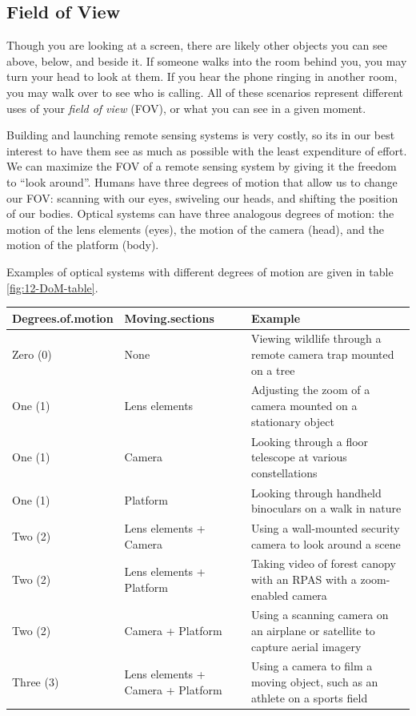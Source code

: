 \documentclass[
]{book}
\begin{document}
\hypertarget{field-of-view}{%
\subsection{Field of View}\label{field-of-view}}

Though you are looking at a screen, there are likely other objects you can see above, below, and beside it. If someone walks into the room behind you, you may turn your head to look at them. If you hear the phone ringing in another room, you may walk over to see who is calling. All of these scenarios represent different uses of your \emph{field of view} (FOV), or what you can see in a given moment.

Building and launching remote sensing systems is very costly, so its in our best interest to have them see as much as possible with the least expenditure of effort. We can maximize the FOV of a remote sensing system by giving it the freedom to ``look around''. Humans have three degrees of motion that allow us to change our FOV: scanning with our eyes, swiveling our heads, and shifting the position of our bodies. Optical systems can have three analogous degrees of motion: the motion of the lens elements (eyes), the motion of the camera (head), and the motion of the platform (body).

Examples of optical systems with different degrees of motion are given in table \ref{fig:12-DoM-table}.

\begin{tabular}{l|l|l}
\hline
Degrees.of.motion & Moving.sections & Example\\
\hline
Zero (0) & None & Viewing wildlife through a remote camera trap mounted on a tree\\
\hline
One (1) & Lens elements & Adjusting the zoom of a camera mounted on a stationary object\\
\hline
One (1) & Camera & Looking through a floor telescope at various constellations\\
\hline
One (1) & Platform & Looking through handheld binoculars on a walk in nature\\
\hline
Two (2) & Lens elements + Camera & Using a wall-mounted security camera to look around a scene\\
\hline
Two (2) & Lens elements + Platform & Taking video of forest canopy with an RPAS with a zoom-enabled camera\\
\hline
Two (2) & Camera + Platform & Using a scanning camera on an airplane or satellite to capture aerial imagery\\
\hline
Three (3) & Lens elements + Camera + Platform & Using a camera to film a moving object, such as an athlete on a sports field\\
\hline
\end{tabular}
\end{document}
